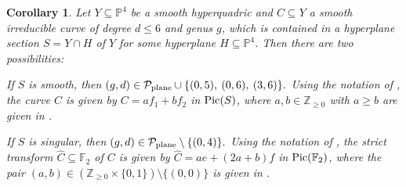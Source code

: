 \documentclass[english,11pt,reqno]{amsart}
\newcommand{\sub}{\subseteq}
\newcommand{\Pfour}{\mathbb{P}^4}
\newcommand{\Z}{\mathbb{Z}}
\newcommand{\Pic}{\textup{Pic}}
\newcommand{\Ftwo}{\mathbb{F}_2}
\newtheorem{cor}[thm]{Corollary}
\begin{document}
%
\begin{cor} \label{lem:existence_of_curves_in_quadric_hypersurface}
Let $Y\sub \Pfour$ be a smooth hyperquadric and $C\sub Y$ a smooth irreducible curve of degree $d \leq 6$ and genus $g$, which is contained in a hyperplane section $S = Y \cap H$ of $Y$ for some hyperplane $H \sub \Pfour$. Then there are two possibilities:
\begin{enumcor}
\item If $S$ is smooth, then $ (g,d) \in \mathcal{P}_{\textup{plane}}\cup \{(0,5), \:(0,6),\:(3,6)\}.$ Using the notation of , the curve $C$ is given by $C=af_1+bf_2$ in $\Pic(S)$, where $a,b\in\Z_{\geq 0}$ with $a\geq b$ are given in . \label{lem:existence_of_curves_in_smooth_quadric_hypersurface}
\item If $S$ is singular, then $(g,d) \in\mathcal{P}_{\textup{plane}}\setminus\{(0,4)\}.$
Using the notation of , the strict transform $\hat{C} \sub \Ftwo$ of $C$ is given by $\hat{C}=ae+(2a+b)f$ in $\Pic(\Ftwo)$, where the pair $(a,b)\in \left(\Z_{\geq 0} \times \{0,1\}\right) \setminus \{(0,0)\}$ is given in . \label{lem:existence_of_curves_in_singular_quadric_hypersurface}
%


\end{enumcor}
\end{cor}
\end{document}
